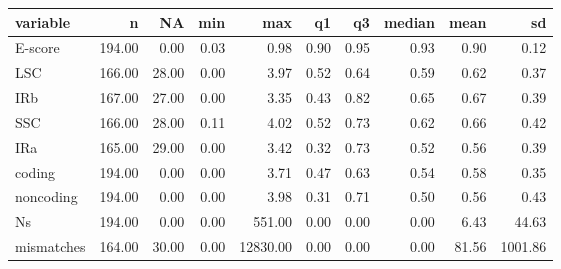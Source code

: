 \begin{table}[ht]
\centering
\begin{tabular}{lrrrrrrrrr}
  \hline
variable & n & NA & min & max & q1 & q3 & median & mean & sd \\ 
  \hline
E-score & 194.00 & 0.00 & 0.03 & 0.98 & 0.90 & 0.95 & 0.93 & 0.90 & 0.12 \\ 
  LSC & 166.00 & 28.00 & 0.00 & 3.97 & 0.52 & 0.64 & 0.59 & 0.62 & 0.37 \\ 
  IRb & 167.00 & 27.00 & 0.00 & 3.35 & 0.43 & 0.82 & 0.65 & 0.67 & 0.39 \\ 
  SSC & 166.00 & 28.00 & 0.11 & 4.02 & 0.52 & 0.73 & 0.62 & 0.66 & 0.42 \\ 
  IRa & 165.00 & 29.00 & 0.00 & 3.42 & 0.32 & 0.73 & 0.52 & 0.56 & 0.39 \\ 
  coding & 194.00 & 0.00 & 0.00 & 3.71 & 0.47 & 0.63 & 0.54 & 0.58 & 0.35 \\ 
  noncoding & 194.00 & 0.00 & 0.00 & 3.98 & 0.31 & 0.71 & 0.50 & 0.56 & 0.43 \\ 
  Ns & 194.00 & 0.00 & 0.00 & 551.00 & 0.00 & 0.00 & 0.00 & 6.43 & 44.63 \\ 
  mismatches & 164.00 & 30.00 & 0.00 & 12830.00 & 0.00 & 0.00 & 0.00 & 81.56 & 1001.86 \\ 
   \hline
\end{tabular}
\end{table}
